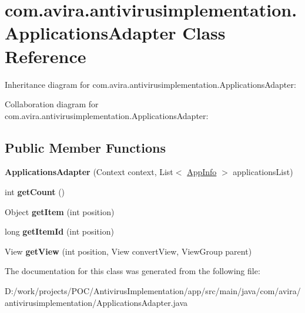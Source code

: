 \hypertarget{classcom_1_1avira_1_1antivirusimplementation_1_1_applications_adapter}{}\section{com.\+avira.\+antivirusimplementation.\+Applications\+Adapter Class Reference}
\label{classcom_1_1avira_1_1antivirusimplementation_1_1_applications_adapter}


Inheritance diagram for com.\+avira.\+antivirusimplementation.\+Applications\+Adapter\+:


Collaboration diagram for com.\+avira.\+antivirusimplementation.\+Applications\+Adapter\+:
\subsection*{Public Member Functions}
\begin{DoxyCompactItemize}
\item 
\hypertarget{classcom_1_1avira_1_1antivirusimplementation_1_1_applications_adapter_a69302a7dbf77c2428264b5dfc7985b57}{}{\bfseries Applications\+Adapter} (Context context, List$<$ \hyperlink{classcom_1_1avira_1_1antivirusimplementation_1_1_app_info}{App\+Info} $>$ applications\+List)\label{classcom_1_1avira_1_1antivirusimplementation_1_1_applications_adapter_a69302a7dbf77c2428264b5dfc7985b57}

\item 
\hypertarget{classcom_1_1avira_1_1antivirusimplementation_1_1_applications_adapter_a8c52c08fc4bde0dc20f54cb1cabe0f40}{}int {\bfseries get\+Count} ()\label{classcom_1_1avira_1_1antivirusimplementation_1_1_applications_adapter_a8c52c08fc4bde0dc20f54cb1cabe0f40}

\item 
\hypertarget{classcom_1_1avira_1_1antivirusimplementation_1_1_applications_adapter_a03fc0091f6159e28f1faeec641fdbb43}{}Object {\bfseries get\+Item} (int position)\label{classcom_1_1avira_1_1antivirusimplementation_1_1_applications_adapter_a03fc0091f6159e28f1faeec641fdbb43}

\item 
\hypertarget{classcom_1_1avira_1_1antivirusimplementation_1_1_applications_adapter_a2d4bfd015b50ca58b1da0ab09f31950f}{}long {\bfseries get\+Item\+Id} (int position)\label{classcom_1_1avira_1_1antivirusimplementation_1_1_applications_adapter_a2d4bfd015b50ca58b1da0ab09f31950f}

\item 
\hypertarget{classcom_1_1avira_1_1antivirusimplementation_1_1_applications_adapter_ab931bf9b39303cc5b8667cdfa32018bf}{}View {\bfseries get\+View} (int position, View convert\+View, View\+Group parent)\label{classcom_1_1avira_1_1antivirusimplementation_1_1_applications_adapter_ab931bf9b39303cc5b8667cdfa32018bf}

\end{DoxyCompactItemize}


The documentation for this class was generated from the following file\+:\begin{DoxyCompactItemize}
\item 
D\+:/work/projects/\+P\+O\+C/\+Antivirus\+Implementation/app/src/main/java/com/avira/antivirusimplementation/Applications\+Adapter.\+java\end{DoxyCompactItemize}

